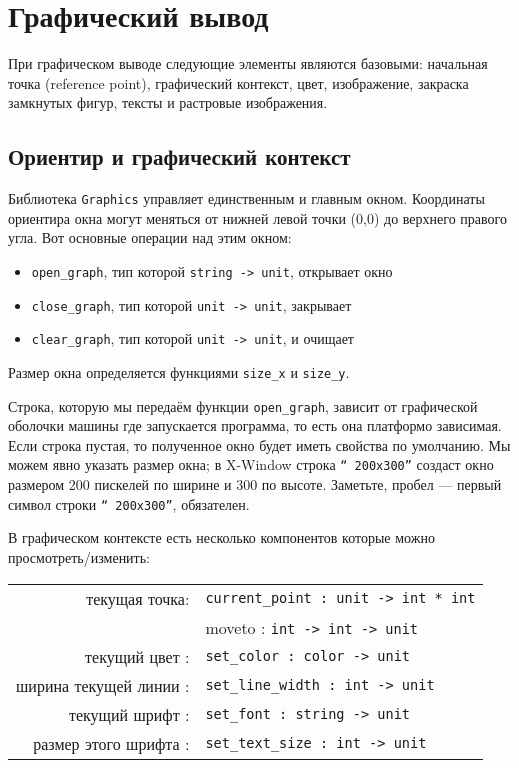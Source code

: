 \section{Графический вывод}
\label{sec:graphical_display}

При графическом выводе следующие элементы являются базовыми: начальная точка
(reference point), графический контекст, цвет, изображение, закраска замкнутых
фигур, тексты и растровые изображения.

\subsection{Ориентир и графический контекст}
\label{subsec:reference_point_and_graphical_context}

Библиотека \texttt{Graphics} управляет единственным и главным окном. Координаты
ориентира окна могут меняться от нижней левой точки (0,0) до верхнего правого
угла. Вот основные операции над этим окном:

\begin{itemize}
	\item \texttt{open\_graph}, тип которой \texttt{string -> unit}, открывает
окно

	\item \texttt{close\_graph}, тип которой \texttt{unit -> unit}, закрывает

	\item \texttt{clear\_graph}, тип которой \texttt{unit -> unit}, и очищает 
\end{itemize}

Размер окна определяется функциями \texttt{size\_x} и \texttt{size\_y}.

Строка, которую мы передаём функции \texttt{open\_graph}, зависит от графической
оболочки машины где запускается программа, то есть она платформо зависимая. Если
строка пустая, то полученное окно будет иметь свойства по умолчанию. Мы можем
явно указать размер окна; в X-Window строка \texttt{`` 200x300''} создаст окно
размером 200 пискелей по ширине и 300 по высоте. Заметьте, пробел --- первый
символ строки \texttt{`` 200x300''}, обязателен.

В графическом контексте есть несколько компонентов которые можно
просмотреть/изменить:

\begin{tabular}{rl}
	текущая точка: & \texttt{current\_point : unit -> int * int} \\
	 & moveto : \texttt{int -> int -> unit} \\
	текущий цвет : & \texttt{set\_color : color -> unit} \\
	ширина текущей линии : & \texttt{set\_line\_width : int -> unit} \\
	текущий шрифт : & \texttt{set\_font : string -> unit} \\
	размер этого шрифта : & \texttt{set\_text\_size : int -> unit} \\
\end{tabular}

